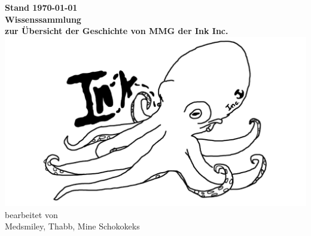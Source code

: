 \documentclass[a4paper,DIV=calc,11pt,%
BCOR=3mm,twoside,headsepline,%
numbers=noenddot,%
bibliography=totoc%
]{scrreprt}
\begin{document}
\begin{titlepage}
	
	
	\centering
	\vfil
	\Large{\textbf{Stand {\today}}} \\ \bigskip
	\vfil
	\textsf{\textbf{\Huge{Wissenssammlung}}} \\ \bigskip
	\Large{\textbf{zur Übersicht der Geschichte von MMG der Ink Inc.}} \\
	\vfil
	\includegraphics[width=\linewidth]{Abbildungen/logo.png}
	\vfil
	\large
	bearbeitet von\\
	Medsmiley, Thabb, Mine Schokokeks
\end{titlepage}


\tableofcontents



%
%
%
%


\end{document}
